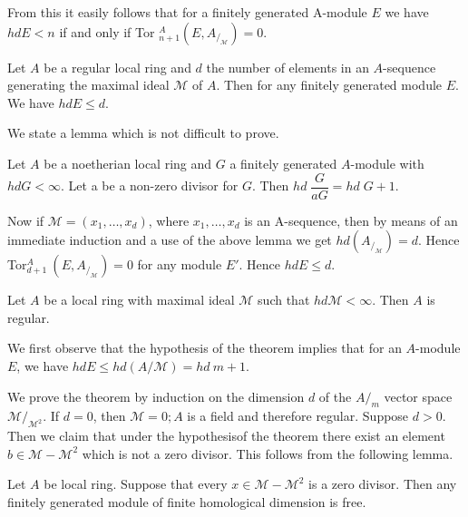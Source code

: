 From this it easily follows that for a finitely generated A-module $E$
we have $hd E < n$ if and only if Tor $^A_{n+1} (E, A_{/_{\mathscr{M}}})=0$. 

\setcounter{theorem}{0}
\begin{theorem}[Syzygies]%
Let $A$ be a regular local ring and $d$ the number of
    elements in an $A$-sequence generating the maximal ideal
    $\mathscr{M}$ of $A$. Then for any finitely generated module
    $E$. We have $hd  E \leq  d$.
\end{theorem}

We state a lemma which is not difficult to prove.

\setcounter{lemma}{1}
\begin{lemma}\label{chap2:lem1.2} %
Let $A$ be a noetherian local ring and $G$ a finitely generated
$A$-module with $hd G < \infty$. Let a be a non-zero divisor for
$G$. Then $hd \; \dfrac{G}{aG} = hd \; G + 1$. 
\end{lemma}    
    
Now if $\mathscr{M} = (x_1, \ldots , x_d)$, where $x_1, \ldots , x_d$
is an A-sequence, then by means of an immediate induction and a use of
the above lemma we get $hd (A_{/_{\mathscr{M}}})= d$. Hence
Tor$^A_{d+1} ~ (E, A_{/_{\mathscr{M}}}) = 0$ for any module $E'$. Hence
$hd E \le d$. 

\setcounter{theorem}{2}
\begin{theorem}[Serre]\label{chap2:thm1.3} %
Let $A$ be a local ring with maximal ideal $\mathscr{M}$ such that $hd
\mathscr{M} < \infty$. Then $A$ is regular. 
\end{theorem}    
    
We first observe that the hypothesis of the theorem implies that for
an $A$-module $E$, we have $hd E \le hd (A/{\mathscr{M}}) = hd ~ m
+1$. 
    
We prove the theorem by induction on the dimension $d$ of the $A/_{m}$
vector space $\mathscr{M}/_{\mathscr{M}^2}$. If $d = 0$, then
$\mathscr{M} = 0; A$ is a field and therefore regular. Suppose $d>
0$. Then we claim that under the hypothesis\pageoriginale of the
theorem there 
exist an element $b \in \mathscr{M} - \mathscr{M}^2$ which is not a
zero divisor. This follows from the following lemma. 

\setcounter{lemma}{3}
\begin{lemma} %
Let $A$ be local ring. Suppose that every $x \in \mathscr{M} -
\mathscr{M}^2$ is a zero divisor. Then any finitely generated module
of finite homological dimension is free. 
\end{lemma}

